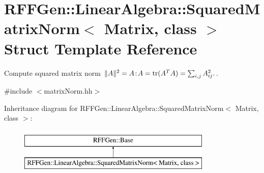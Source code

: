 \hypertarget{structRFFGen_1_1LinearAlgebra_1_1SquaredMatrixNorm}{\section{R\-F\-F\-Gen\-:\-:Linear\-Algebra\-:\-:Squared\-Matrix\-Norm$<$ Matrix, class $>$ Struct Template Reference}
\label{structRFFGen_1_1LinearAlgebra_1_1SquaredMatrixNorm}
}


Compute squared matrix norm $ \|A\|^2 = A\negthinspace : \negthinspace A = \mathrm{tr}(A^TA) = \sum_{i,j} A_{ij}^2. $.  




{\ttfamily \#include $<$matrix\-Norm.\-hh$>$}

Inheritance diagram for R\-F\-F\-Gen\-:\-:Linear\-Algebra\-:\-:Squared\-Matrix\-Norm$<$ Matrix, class $>$\-:\begin{figure}[H]
\begin{center}
\leavevmode
\includegraphics[height=2.000000cm]{structRFFGen_1_1LinearAlgebra_1_1SquaredMatrixNorm}
\end{center}
\end{figure}
